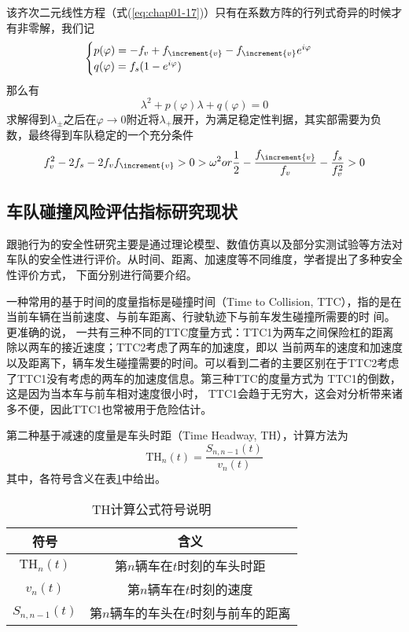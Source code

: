 该齐次二元线性方程（式(\ref{eq:chap01-17})）只有在系数方阵的行列式奇异的时候才有非零解，我们记
\begin{equation}
  \begin{cases}
    p(\varphi) = -f_v + f_{\increment{v}} - f_{\increment{v}}e^{i\varphi} \\
    q(\varphi) = f_s(1-e^{\-i\varphi})
  \end{cases}
  \label{eq:chap01-18}
\end{equation}
那么有
\begin{equation}
  \lambda^2 + p(\varphi)\lambda + q(\varphi) = 0
  \label{eq:chap01-19}
\end{equation}
求解得到$\lambda_{\pm}$之后在$\varphi \rightarrow 0$附近将$\lambda_+$展开，为满足稳定性判据，其实部需要为负数，最终得到车队稳定的一个充分条件
\begin{equation}
  f_v^2 - 2f_s -2f_vf_{\increment{v}} >0>\-\omega^2 or \frac{1}{2} - \frac{f_{\increment{v}}}{f_v} - \frac{f_s}{f_v^2} > 0
  \label{eq:chap01-20}
\end{equation}

\subsection{车队碰撞风险评估指标研究现状}

跟驰行为的安全性研究主要是通过理论模型、数值仿真以及部分实测试验等方法对车队的安全性进行评价。从时间、距离、加速度等不同维度，学者提出了多种安全性评价方式，
下面分别进行简要介绍。

一种常用的基于时间的度量指标是碰撞时间（Time to Collision, TTC），指的是在当前车辆在当前速度、与前车距离、行驶轨迹下与前车发生碰撞所需要的时
间\cite{Horst1990ATA}。更准确的说， 一共有三种不同的TTC度量方式：TTC1为两车之间保险杠的距离除以两车的接近速度；TTC2考虑了两车的加速度，即以
当前两车的速度和加速度以及距离下，辆车发生碰撞需要的时间。可以看到二者的主要区别在于TTC2考虑了TTC1没有考虑的两车的加速度信息。第三种TTC的度量方式为
TTC1的倒数，这是因为当本车与前车相对速度很小时， TTC1会趋于无穷大，这会对分析带来诸多不便，因此TTC1也常被用于危险估计。

第二种基于减速的度量是车头时距（Time Headway, TH），计算方法为
\begin{equation}
  \mathrm{TH}_n(t) = \frac{S_{n, n-1}(t)}{v_n(t)}
  \label{eq:chap01-21}
\end{equation}
其中，各符号含义在表\ref{tab:chap01-8}中给出。
\begin{table}
  \centering
  \caption{TH计算公式符号说明}
  \begin{tabular}{cc}
    \toprule
    符号          &  含义                         \\
    \midrule
    $\mathrm{TH}_n(t)$          &    第$n$辆车在$t$时刻的车头时距         \\
    $v_n(t)$           &    第$n$辆车在$t$时刻的速度       \\
    $S_{n, n-1}(t)$    &    第$n$辆车的车头在$t$时刻与前车的距离      \\
    \bottomrule
  \end{tabular}
  \label{tab:chap01-8}
\end{table}

